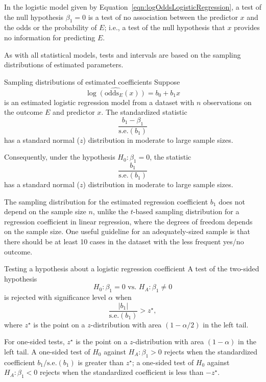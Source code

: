 In the logistic model given by Equation~\ref{eqn:logOddsLogisticRegression}, a test of the null hypothesis $\beta_1 = 0$ is a test of no association between the predictor $x$ and the odds or the probability of $E$; i.e., a test of the null hypothesis that $x$ provides no information for predicting $E$.

As with all statistical models, tests and intervals are based on the sampling distributions of estimated parameters.

\begin{onebox}{Sampling distributions of estimated coefficients}
Suppose
\[
  \widehat{\log(\textrm{odds}_{E}(x))} = b_0 + b_1 x
\]
is an estimated logistic regression model from a dataset with $n$ observations on the outcome $E$ and predictor $x$.  The standardized statistic
\[
      \frac{b_1 - \beta_1}{\textrm{s.e.}(b_1)}
\]
has a standard normal ($z$) distribution in moderate to large sample sizes.

Consequently, under the hypothesis $H_0: \beta_1 = 0$, the statistic
\[
      \frac{b_1}{\textrm{s.e.}(b_1)}
\]
has a standard normal ($z$) distribution in moderate to large sample sizes.
\end{onebox}

The sampling distribution for the estimated regression coefficient $b_1$ does not depend on the sample size $n$, unlike the $t$-based sampling distribution for a regression coefficient in linear regression, where the degrees of freedom depends on the sample size.  One useful guideline for an adequately-sized sample is that there should be at least 10 cases in the dataset with the less frequent yes/no outcome.

\begin{onebox}{Testing a hypothesis about a logistic regression coefficient}
A test of the two-sided hypothesis
\[
  H_0: \beta_1 = 0 \text{ vs. } H_A: \beta_1 \ne 0
\]
is rejected with significance level $\alpha$ when
\[
     \frac{|b_1|}{\textrm{s.e.}(b_1)} > z^\star,
\]
where $z^\star$ is the point on a $z$-distribution with area $(1 - \alpha/2)$ in the left tail.
\end{onebox}

For one-sided tests, $z^\star$ is the point on a $z$-distribution with area $(1 - \alpha)$ in the left tail. A one-sided test of $H_0$ against $H_A: \beta_1 > 0$ rejects when the standardized coefficient $b_1/\textrm{s.e.}(b_1)$ is greater than  $ z^\star$; a one-sided test of $H_0$ against $H_A: \beta_1 < 0$  rejects when the standardized coefficient is less than $-z^\star$.


